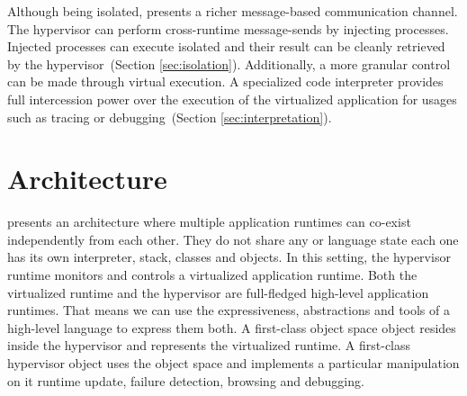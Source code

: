 Although being isolated, \Vtt presents a richer message-based communication channel. The hypervisor can perform cross-runtime message-sends by injecting processes. Injected processes can execute isolated and their result can be cleanly retrieved by the hypervisor~(Section \ref{sec:isolation}).
Additionally, a more granular control can be made through virtual execution. A specialized code interpreter provides full intercession power over the execution of the virtualized application for usages such as tracing or debugging~(Section \ref{sec:interpretation}).





\section{\Vtt Architecture} \label{sec:virtualization_overview}

\Vtt presents an architecture where multiple application runtimes can co-exist independently from each other. They do not share any \VM or language state \ie each one has its own interpreter, stack, classes and objects. In this setting, the hypervisor runtime monitors and controls a virtualized application runtime. Both the virtualized runtime and the hypervisor are full-fledged high-level application runtimes. That means we can use the expressiveness, abstractions and tools of a high-level language to express them both. A first-class object space object resides inside the hypervisor and represents the virtualized runtime. A first-class hypervisor object uses the object space and implements a particular manipulation on it \eg runtime update, failure detection, browsing and debugging. %

